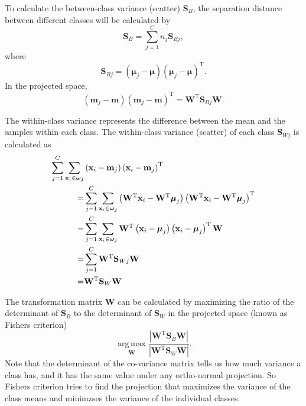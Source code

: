 To calculate the between-class variance (scatter) $\mathbf{S}_B$, the separation distance between different classes will be calculated by
\begin{equation}
    \mathbf{S}_B=\sum_{j=1}^C n_j\mathbf{S}_{Bj},
\end{equation}
where
\begin{equation}
	\mathbf{S}_{Bj}=(\boldsymbol{\mu}_j-\boldsymbol{\mu})(\boldsymbol{\mu}_j-\boldsymbol{\mu})^{\operatorname{T}}.
\end{equation}
In the projected space,
\begin{equation}
	(\mathbf{m}_j-\mathbf{m})(\mathbf{m}_j-\mathbf{m})^{\operatorname{T}}=\mathbf{W}^{\operatorname{T}}\mathbf{S}_{Bj}\mathbf{W}.
\end{equation}

The within-class variance represents the difference between the mean and the samples within each class. The within-class variance (scatter) of each class $\mathbf{S}_{Wj}$ is calculated as
\begin{align}
	\sum_{j=1}^C\sum_{\mathbf{x}_i\in \boldsymbol{\omega_j}}&\left(\mathbf{x}_i-\mathbf{m}_j\right)\left(\mathbf{x}_i-\mathbf{m}_j\right)^{\operatorname{T}}\notag\\
	=&\sum_{j=1}^C\sum_{\mathbf{x}_i\in \boldsymbol{\omega_j}} \left(\mathbf{W}^{\operatorname{T}}\mathbf{x}_i-\mathbf{W}^{\operatorname{T}}\boldsymbol{\mu}_j\right)\left(\mathbf{W}^{\operatorname{T}}\mathbf{x}_i-\mathbf{W}^{\operatorname{T}}\boldsymbol{\mu}_j\right)^{\operatorname{T}}\notag\\
	=&\sum_{j=1}^C\sum_{\mathbf{x}_i\in \boldsymbol{\omega_j}} \mathbf{W}^{\operatorname{T}}\left(\mathbf{x}_i-\boldsymbol{\mu}_j\right)\left(\mathbf{x}_i-\boldsymbol{\mu}_j\right)^{\operatorname{T}}\mathbf{W}\notag\\
	=&\sum_{j=1}^C\mathbf{W}^{\operatorname{T}}\mathbf{S}_{Wj}\mathbf{W}\notag\\
	=&\mathbf{W}^{\operatorname{T}}\mathbf{S}_{W}\mathbf{W}
\end{align}

The transformation matrix $\mathbf{W}$ can be calculated by maximizing the ratio of the determinant of $\mathbf{S}_B$ to the determinant of $\mathbf{S}_W$ in the projected space (known as Fishers criterion) 
\begin{equation}
	\operatorname*{arg\,max}\limits_{\substack{\mathbf{W}}}\frac{|\mathbf{W}^{\operatorname{T}}\mathbf{S}_B\mathbf{W}|}{|\mathbf{W}^{\operatorname{T}}\mathbf{S}_W\mathbf{W}|}.
\end{equation}
Note that the determinant of the co-variance matrix tells us how much variance a class has, and it has the same value under any ortho-normal projection. So Fishers criterion tries to find the projection that maximizes the variance of the class means and minimzses the variance of the individual classes.

